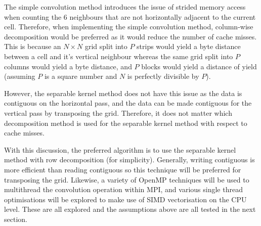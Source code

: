    The simple convolution method introduces the issue of strided memory access when counting the 6 neighbours that are
    not horizontally adjacent to the current cell.
    Therefore, when implementing the simple convolution method, column-wise decomposition would be preferred as it would 
    reduce the number of cache misses.
    This is because an $N \times N$ grid split into $P$ strips would yield a  byte distance
    between a cell and it's vertical neighbour whereas the same grid split into $P$ columns would yield a
     byte distance, and $P$ blocks would yield a distance of yield
     (assuming $P$ is a square number and $N$ is perfectly divisible by $P$).

    However, the separable kernel method does not have this issue as the data is contiguous on the horizontal pass,
    and the data can be made contiguous for the vertical pass by transposing the grid.
    Therefore, it does not matter which decomposition method is used for the separable kernel method with respect to cache
    misses.

    With this discussion, the preferred algorithm is to use the separable kernel method with row decomposition (for
    simplicity).
    Generally, writing contiguous is more efficient than reading contiguous so this technique will be preferred for
    transposing the grid.
    Likewise, a variety of OpenMP techniques will be used to multithread the convolution operation within MPI, and various
    single thread optimisations will be explored to make use of SIMD vectorisation on the CPU level.
    These are all explored and the assumptions above are all tested in the next section.


